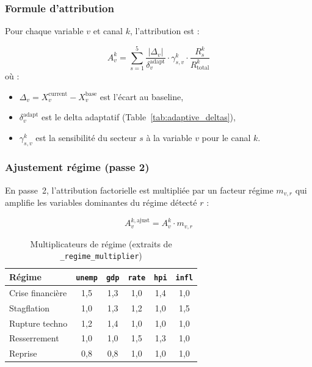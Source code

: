 \documentclass[12pt,a4paper]{article}
\begin{document}
\subsubsection{Formule d'attribution}

Pour chaque variable $v$ et canal $k$, l'attribution est :

\begin{formulebox}
\begin{equation}
    A_{v}^{k} = \sum_{s=1}^{5}
    \frac{|\Delta_v|}{\delta_v^{\text{adapt}}}
    \cdot \gamma_{s,v}^{k}
    \cdot \frac{R_{s}^{k}}{R_{\text{total}}^{k}}
    \label{eq:attribution}
\end{equation}
o\`u :
\begin{itemize}[nosep]
    \item $\Delta_v = X_v^{\text{current}} - X_v^{\text{base}}$ est l'\'ecart au baseline,
    \item $\delta_v^{\text{adapt}}$ est le delta adaptatif (Table~\ref{tab:adaptive_deltas}),
    \item $\gamma_{s,v}^{k}$ est la sensibilit\'e du secteur $s$ \`a la variable $v$ pour le canal $k$.
\end{itemize}
\end{formulebox}

\subsubsection{Ajustement r\'egime (passe 2)}

En passe~2, l'attribution factorielle est multipli\'ee par un facteur r\'egime
$m_{v,r}$ qui amplifie les variables dominantes du r\'egime d\'etect\'e $r$ :

\begin{equation}
    A_{v}^{k,\text{ajust}} = A_{v}^{k} \cdot m_{v,r}
    \label{eq:regime_mult}
\end{equation}

\begin{table}[htbp]
\centering
\caption{Multiplicateurs de r\'egime (extraits de \texttt{\_regime\_multiplier})}
\begin{tabular}{lccccc}
\toprule
\textbf{R\'egime} & \texttt{unemp} & \texttt{gdp} & \texttt{rate} & \texttt{hpi} & \texttt{infl} \\
\midrule
Crise financi\`ere & 1,5 & 1,3 & 1,0 & 1,4 & 1,0 \\
Stagflation & 1,0 & 1,3 & 1,2 & 1,0 & 1,5 \\
Rupture techno & 1,2 & 1,4 & 1,0 & 1,0 & 1,0 \\
Resserrement & 1,0 & 1,0 & 1,5 & 1,3 & 1,0 \\
Reprise & 0,8 & 0,8 & 1,0 & 1,0 & 1,0 \\
\bottomrule
\end{tabular}
\label{tab:regime_mult}
\end{table}
\end{document}
